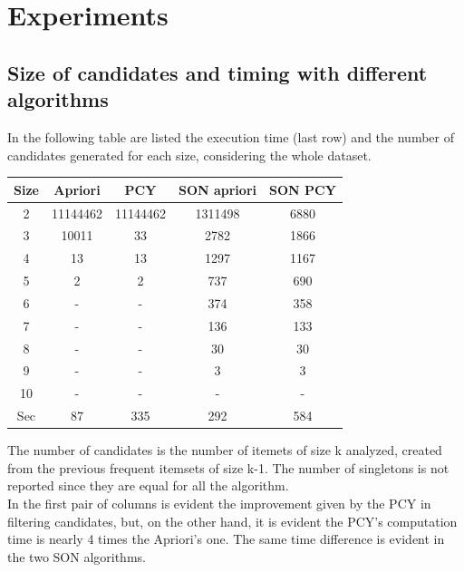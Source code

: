 \documentclass[14pt]{extarticle}
\begin{document}
\section{Experiments}
\subsection{Size of candidates and timing with different algorithms}
In the following table are listed the execution time (last row) and the number of candidates generated for each size, considering the whole dataset.
\begin{center}
\begin{tabular}{ |c|c|c|c|c| } 
 \hline
 Size & Apriori & PCY & SON apriori & SON PCY \\
 \hline
 2 & 11144462 & 11144462 & 1311498 & 6880\\ 
 3 & 10011 & 33 & 2782 & 1866\\ 
 4 & 13 & 13 & 1297 & 1167\\ 
 5 & 2 & 2 & 737 & 690 \\
 6 & - & - & 374 & 358 \\
 7 & - & - & 136 & 133 \\
 8 & - & - & 30 & 30 \\
 9 & - & - & 3 & 3 \\
 10 & - & - & - & - \\
 \hline
 Sec & 87 & 335 & 292 & 584\\
 \hline
\end{tabular}
\end{center}
The number of candidates is the number of itemets of size k analyzed, created from the previous frequent itemsets of size k-1. The number of singletons is not reported since they are equal for all the algorithm.\\
In the first pair of columns is evident the improvement given by the PCY in filtering candidates, but, on the other hand, it is evident the PCY's computation time is nearly 4 times the Apriori's one. The same time difference is evident in the two SON algorithms.\\
\end{document}

